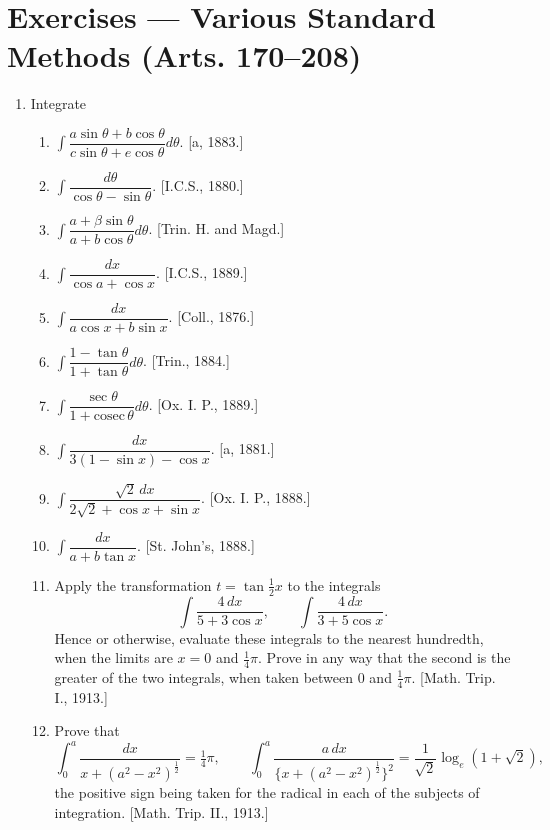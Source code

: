 \documentclass[11pt, a4paper]{article}
\newcommand{\source}[1]{\hfill\textnormal{[#1]}}
\begin{document}
\section*{Exercises --- Various Standard Methods (Arts. 170--208)}

\begin{enumerate}[leftmargin=2em]

\item Integrate
\begin{enumerate}[label=(\roman*)]
\item $\displaystyle\int \dfrac{a\sin\theta+b\cos\theta}{c\sin\theta+e\cos\theta}d\theta$. \source{a, 1883.}
\item $\displaystyle\int \dfrac{d\theta}{\cos\theta-\sin\theta}$. \source{I.C.S., 1880.}
\item $\displaystyle\int \dfrac{a+\beta\sin\theta}{a+b\cos\theta}d\theta$. \source{Trin. H. and Magd.}
\item $\displaystyle\int \dfrac{dx}{\cos a+\cos x}$. \source{I.C.S., 1889.}
\item $\displaystyle\int \dfrac{dx}{a\cos x+b\sin x}$. \source{Coll., 1876.}
\item $\displaystyle\int \dfrac{1-\tan\theta}{1+\tan\theta}d\theta$. \source{Trin., 1884.}
\item $\displaystyle\int \dfrac{\sec\theta}{1+\text{cosec}\,\theta}d\theta$. \source{Ox. I. P., 1889.}
\item $\displaystyle\int \dfrac{dx}{3(1-\sin x)-\cos x}$. \source{a, 1881.}
\item $\displaystyle\int \dfrac{\sqrt2\,dx}{2\sqrt2+\cos x+\sin x}$. \source{Ox. I. P., 1888.}
\item $\displaystyle\int \dfrac{dx}{a+b\tan x}$. \source{St. John's, 1888.}
\item Apply the transformation $t=\tan\tfrac12 x$ to the integrals
\[
\int \dfrac{4\,dx}{5+3\cos x}, \qquad \int \dfrac{4\,dx}{3+5\cos x}.
\]
Hence or otherwise, evaluate these integrals to the nearest hundredth, when the limits are $x=0$ and $\tfrac14\pi$. Prove in any way that the second is the greater of the two integrals, when taken between $0$ and $\tfrac14\pi$. \source{Math. Trip. I., 1913.}
\item Prove that
\[
\int_0^a \dfrac{dx}{x+(a^2-x^2)^{\frac12}} = \tfrac14\pi, \qquad \int_0^a \dfrac{a\,dx}{\{x+(a^2-x^2)^{\frac12}\}^2} = \dfrac{1}{\sqrt2}\log_e(1+\sqrt2),
\]
the positive sign being taken for the radical in each of the subjects of integration. \source{Math. Trip. II., 1913.}
\end{enumerate}


\end{enumerate}
\end{document}

